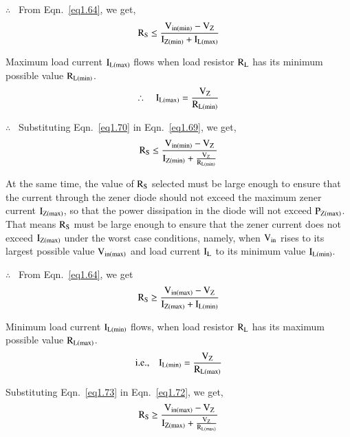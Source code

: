 $\therefore$~ From Eqn.~\eqref{eq1.64}, we get, 
\begin{equation}
\textrm{R}_{\textrm{S}} \leq \dfrac{\textrm{V}_{\text{in}(\min)}-\textrm{V}_{\textrm{Z}}}{\textrm{I}_{\textrm{Z}(\min)}+\textrm{I}_{\textrm{L}(\max)}}\label{eq1.69}
\end{equation}

Maximum load current $\textrm{I}_{\textrm{L}(\max)}$ flows when load resistor $\textrm{R}_{\textrm{L}}$ has its minimum possible value $\textrm{R}_{\textrm{L}(\min)}$.
\begin{equation}
\therefore\quad \textrm{I}_{\textrm{L}(\max)}=\frac{\textrm{V}_{\textrm{Z}}}{\textrm{R}_{\textrm{L}(\min)}}\label{eq1.70}
\end{equation}

$\therefore$~ Substituting Eqn.~\eqref{eq1.70} in Eqn.~\eqref{eq1.69}, we get,
\begin{equation}
\textrm{R}_{\textrm{S}} \leq \dfrac{\textrm{V}_{\text{in}(\min)}-\textrm{V}_{\textrm{Z}}}{\textrm{I}_{\textrm{Z}(\min)}+\frac{\textrm{V}_{\textrm{Z}}}{\textrm{R}_{\textrm{L}(\min)}}}\label{eq1.71}
\end{equation}

At the same time, the value of $\textrm{R}_{\textrm{S}}$ selected must be large enough to ensure that the current through the zener diode should not exceed the maximum zener current $\textrm{I}_{\textrm{Z}(\max)}$, so that the power dissipation in the diode will not exceed $\textrm{P}_{\textrm{Z}(\max)}$. That means $\textrm{R}_{\textrm{S}}$ must be large enough to ensure that the zener current does not exceed $\textrm{I}_{\textrm{Z}(\max)}$ under the worst case conditions, namely, when $\textrm{V}_{\text{in}}$ rises to its largest possible value $\textrm{V}_{\text{in}(\max)}$ and load current $\textrm{I}_{\textrm{L}}$ to its minimum value $\textrm{I}_{\textrm{L}(\min)}$.

$\therefore$~ From Eqn.~\eqref{eq1.64}, we get
\begin{equation}
\textrm{R}_{\textrm{S}}\geq \frac{\textrm{V}_{\text{in}(\max)}-\textrm{V}_{\textrm{Z}}}{\textrm{I}_{\textrm{Z}(\max)}+\textrm{I}_{\textrm{L}(\min)}}\label{eq1.72}
\end{equation}

Minimum load current $\textrm{I}_{\textrm{L}(\min)}$ flows, when load resistor $\textrm{R}_{\textrm{L}}$ has its maximum possible value $\textrm{R}_{\textrm{L}(\max)}$.
\begin{equation}
\text{i.e.,}\quad \textrm{I}_{\textrm{L}(\min)}=\frac{\textrm{V}_{\textrm{Z}}}{\textrm{R}_{\textrm{L}(\max)}}\label{eq1.73}
\end{equation}

Substituting Eqn.~\eqref{eq1.73} in Eqn.~\eqref{eq1.72}, we get,
\begin{equation}
\textrm{R}_{\textrm{S}}\geq \frac{\textrm{V}_{\text{in}(\max)}-\textrm{V}_{\textrm{Z}}}{\textrm{I}_{\textrm{Z}(\max)}+\frac{\textrm{V}_{\textrm{Z}}}{\textrm{R}_{\textrm{L}(\max)}}}\label{eq1.74}
\end{equation}

